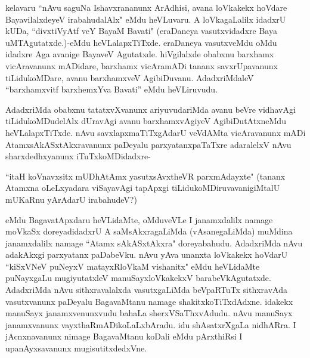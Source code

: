 kelavaru ``nAvu saguNa Ishavxrananunx ArAdhisi, avana loVkakekx hoVdare BayavilalxdeyeV irabahudalAlx" eMdu heVLuvaru. A loVkagaLalilx idadxrU kUDa, ``divxtiVyAtf veY BayaM Bavati" (eraDaneya vasutxvidadxre Baya uMTAgutatxde.)-eMdu heVLalapxTiTxde. eraDaneya vasutxveMdu oMdu idadxre Aga avanige BayaveV Agutatxde. hiVgilalxde obabxnu barxhamx vicAravanunx mADidare, barxhamx vicAramADi tananx savxrUpavanunx tiLidukoMDare, avanu barxhamxveV AgibiDuvanu. AdadxriMdaleV ``barxhamxvitf barxhemxYva Bavati'' eMdu heVLiruvudu.

AdadxriMda obabxnu tatatxvXvanunx ariyuvudariMda avanu beVre vidhavAgi tiLidukoMDudelAlx dUravAgi avanu barxhamxvAgiyeV AgibiDutAtxneMdu heVLalapxTiTxde. nAvu savxlapxmaTiTxgAdarU veVdAMta vicAravanunx mADi AtamxsAkASxtAkxravanunx paDeyalu parxyatanxpaTaTxre adaralelxV nAvu sharxdedhxyanunx iTuTxkoMDidadxre-

``itaH koVnavxsitx mUDhAtAmx yasutxsAvxtheVR parxmAdayxte" (tananx Atamxna oLeLxyadara viSayavAgi tapApxgi tiLidukoMDiruvavanigiMtalU mUKaRnu yArAdarU irabahudeV?)

eMdu BagavatApxdaru heVLidaMte, oMduveVLe I janamxdalilx namage moVkaSx doreyadidadxrU A saMsAkxragaLiMda (vAsanegaLiMda) muMdina janamxdalilx namage ``Atamx sAkASxtAkxra" doreyabahudu. AdadxriMda nAvu adakAkxgi parxyatanx paDabeVku. nAvu yAva unanxta loVkakekx hoVdarU ``kiSxVNeV puNeyxV matayxRloVkaM vishanitx" eMdu heVLidaMte puNayxgaLu mugiyutatxleV manuSayxloVkakekxV barabeVkAgutatxde. AdadxriMda nAvu sithxravalalxda vasutxgaLiMda beVpaRTuTx sithxravAda vasutxvanunx paDeyalu BagavaMtanu namage shakitxkoTiTxdAdxne. idakekx manuSayx janamxvenunxvudu bahaLa sherxVSaThxvAdudu. nAvu manuSayx janamxvanunx vayxthaRmADikoLaLxbAradu. idu shAsatxrXgaLa nidhARra. I jAcnxnavanunx nimage BagavaMtanu koDali eMdu pArxthiRsi I upanAyxsavanunx mugisutitxdedxVne.


\endchapter

